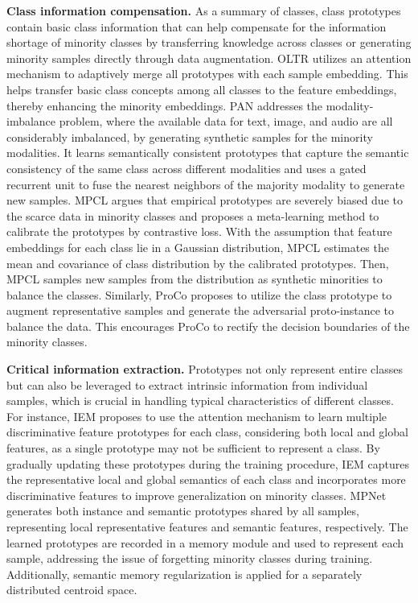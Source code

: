 \textbf{Class information compensation.}
As a summary of classes, class prototypes contain basic class information that can help compensate for the information shortage of minority classes by transferring knowledge across classes or generating minority samples directly through data augmentation.
OLTR \cite{liu2019large} utilizes an attention mechanism to adaptively merge all prototypes with each sample embedding. This helps transfer basic class concepts among all classes to the feature embeddings, thereby enhancing the minority embeddings.
PAN \cite{zeng2021pan} addresses the modality-imbalance problem, where the available data for text, image, and audio are all considerably imbalanced, by generating synthetic samples for the minority modalities. It learns semantically consistent prototypes that capture the semantic consistency of the same class across different modalities and uses a gated recurrent unit to fuse the nearest neighbors of the majority modality to generate new samples. 
MPCL \cite{fu2022meta} argues that empirical prototypes are severely biased due to the scarce data in minority classes and proposes a meta-learning method to calibrate the prototypes by contrastive loss. With the assumption that feature embeddings for each class lie in a Gaussian distribution, MPCL estimates the mean and covariance of class distribution by the calibrated prototypes. Then, MPCL samples new samples from the distribution as synthetic minorities to balance the classes.
Similarly, ProCo \cite{yang2022proco} proposes to utilize the class prototype to augment representative samples and generate the adversarial proto-instance to balance the data. This encourages ProCo to rectify the decision boundaries of the minority classes.

\textbf{Critical information extraction.}
Prototypes not only represent entire classes but can also be leveraged to extract intrinsic information from individual samples, which is crucial in handling typical characteristics of different classes. 
For instance, IEM \cite{zhu2020inflated} proposes to use the attention mechanism to learn multiple discriminative feature prototypes for each class, considering both local and global features, as a single prototype may not be sufficient to represent a class. By gradually updating these prototypes during the training procedure, IEM captures the representative local and global semantics of each class and incorporates more discriminative features to improve generalization on minority classes.
MPNet \cite{he2020learning} generates both instance and semantic prototypes shared by all samples, representing local representative features and semantic features, respectively. The learned prototypes are recorded in a memory module and used to represent each sample, addressing the issue of forgetting minority classes during training. Additionally, semantic memory regularization is applied for a separately distributed centroid space.




